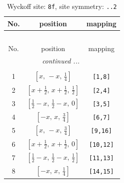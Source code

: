 \documentclass[fleqn,8pt]{jsarticle}
\begin{document}
\begin{longtable}{ccc}
\caption{Wyckoff site: {\tt 8f}, site symmetry: {\tt ..2}}
 \\
 \hline \hline
No. & position & mapping \\ \hline \endfirsthead

\multicolumn{2}{l}{\tablename\ \thetable{}} \\
 \hline \hline
No. & position & mapping \\ \hline \endhead

 \hline \hline
\multicolumn{2}{r}{\footnotesize\it continued ...} \\ \endfoot

 \hline \hline
\multicolumn{2}{r}{} \\ \endlastfoot

1 & $\left[ x,\, - x,\, \frac{1}{4} \right]$ & {\tt [1,8]} \\ \hline
2 & $\left[ x + \frac{1}{2},\, x + \frac{1}{2},\, \frac{1}{2} \right]$ & {\tt [2,4]} \\ \hline
3 & $\left[ \frac{1}{2} - x,\, \frac{1}{2} - x,\, 0 \right]$ & {\tt [3,5]} \\ \hline
4 & $\left[ - x,\, x,\, \frac{3}{4} \right]$ & {\tt [6,7]} \\ \hline
5 & $\left[ x,\, - x,\, \frac{3}{4} \right]$ & {\tt [9,16]} \\ \hline
6 & $\left[ x + \frac{1}{2},\, x + \frac{1}{2},\, 0 \right]$ & {\tt [10,12]} \\ \hline
7 & $\left[ \frac{1}{2} - x,\, \frac{1}{2} - x,\, \frac{1}{2} \right]$ & {\tt [11,13]} \\ \hline
8 & $\left[ - x,\, x,\, \frac{1}{4} \right]$ & {\tt [14,15]} \\
\end{longtable}
\renewcommand{\arraystretch}{1.2}
\end{document}
